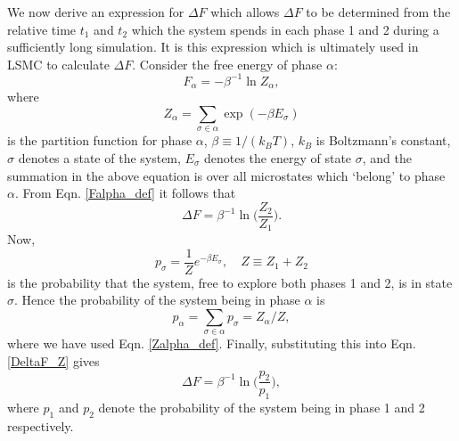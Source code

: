 \documentclass{report}
\begin{document}
We now derive an expression for $\Delta F$ which allows $\Delta F$ to be determined from the relative time $t_1$ and $t_2$ which the system spends 
in each phase 1 and 2 during a sufficiently long simulation. It is this expression which is ultimately used in LSMC to calculate $\Delta F$. 
Consider the free energy of phase $\alpha$:
\begin{equation}\label{Falpha_def}
F_{\alpha}=-\beta^{-1}\ln Z_{\alpha},
\end{equation}
where
\begin{equation}\label{Zalpha_def}
Z_{\alpha}=\sum_{\sigma\in\alpha}\exp(-\beta E_{\sigma})
\end{equation}
is the partition function for phase $\alpha$, $\beta\equiv 1/(k_BT)$, $k_B$ is Boltzmann's constant, $\sigma$ denotes a state of the system, $E_{\sigma}$ 
denotes the energy of state $\sigma$, and the summation in the above equation is over all microstates which `belong' to phase $\alpha$. 
From Eqn. \eqref{Falpha_def} it follows that
\begin{equation}\label{DeltaF_Z}
\Delta F=\beta^{-1}\ln\biggl(\frac{Z_2}{Z_1}\biggr).
\end{equation}
Now,
\begin{equation}\label{MC_prob}
p_{\sigma}=\frac{1}{Z}e^{-\beta E_{\sigma}}, \quad Z\equiv Z_1+Z_2
\end{equation}
is the probability that the system, free to explore both phases 1 and 2, is in state $\sigma$. Hence the probability of the system being in
phase $\alpha$ is
\begin{equation}
p_{\alpha} = \sum_{\sigma\in \alpha}p_{\sigma} = Z_{\alpha}/Z,
\end{equation}
where we have used Eqn. \eqref{Zalpha_def}. Finally, substituting this into Eqn. \eqref{DeltaF_Z} gives
\begin{equation}\label{DeltaF_stat_mech}
\Delta F=\beta^{-1}\ln\biggl(\frac{p_2}{p_1}\biggr),
\end{equation}
where $p_1$ and $p_2$ denote the probability of the system being in phase 1 and 2 respectively.  
\end{document}
